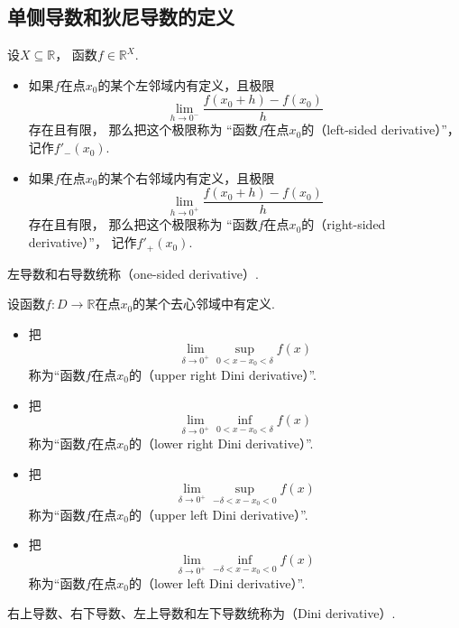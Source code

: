 \subsection{单侧导数和狄尼导数的定义}
\begin{definition}
设\(X\subseteq\mathbb{R}\)，
函数\(f\in\mathbb{R}^X\).
\begin{itemize}
	\item 如果\(f\)在点\(x_0\)的某个左邻域内有定义，且极限\begin{equation*}
		\lim_{h\to0^-} \frac{f(x_0+h)-f(x_0)}{h}
	\end{equation*}存在且有限，
	那么把这个极限称为
	“函数\(f\)在点\(x_0\)的（left-sided derivative）”，
	记作\(f'_-(x_0)\).
	\item 如果\(f\)在点\(x_0\)的某个右邻域内有定义，且极限\begin{equation*}
		\lim_{h\to0^+} \frac{f(x_0+h)-f(x_0)}{h}
	\end{equation*}存在且有限，
	那么把这个极限称为
	“函数\(f\)在点\(x_0\)的（right-sided derivative）”，
	记作\(f'_+(x_0)\).
\end{itemize}
左导数和右导数统称（one-sided derivative）.
\end{definition}

\begin{definition}
设函数\(f\colon D\to\mathbb{R}\)在点\(x_0\)的某个去心邻域中有定义.
\begin{itemize}
	\item 把\begin{equation*}
		\lim_{\delta\to0^+} \sup_{0<x-x_0<\delta} f(x)
	\end{equation*}称为“函数\(f\)在点\(x_0\)的（upper right Dini derivative）”.
	\item 把\begin{equation*}
		\lim_{\delta\to0^+} \inf_{0<x-x_0<\delta} f(x)
	\end{equation*}称为“函数\(f\)在点\(x_0\)的（lower right Dini derivative）”.
	\item 把\begin{equation*}
		\lim_{\delta\to0^+} \sup_{-\delta<x-x_0<0} f(x)
	\end{equation*}称为“函数\(f\)在点\(x_0\)的（upper left Dini derivative）”.
	\item 把\begin{equation*}
		\lim_{\delta\to0^+} \inf_{-\delta<x-x_0<0} f(x)
	\end{equation*}称为“函数\(f\)在点\(x_0\)的（lower left Dini derivative）”.
\end{itemize}
右上导数、右下导数、左上导数和左下导数统称为（Dini derivative）.
\end{definition}

